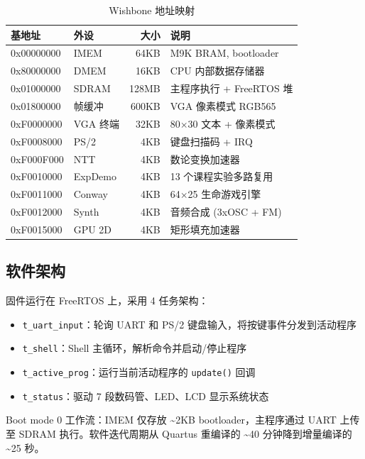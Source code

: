 \documentclass{SYSUReport}
\begin{document}
\begin{table}[!htbp]
    \centering
    \small
    \begin{tabular}{l|l|r|l}
        \hline
        \textbf{基地址} & \textbf{外设} & \textbf{大小} & \textbf{说明} \\
        \hline
        0x00000000 & IMEM   & 64KB  & M9K BRAM, bootloader \\
        0x80000000 & DMEM   & 16KB  & CPU 内部数据存储器 \\
        0x01000000 & SDRAM  & 128MB & 主程序执行 + FreeRTOS 堆 \\
        0x01800000 & 帧缓冲 & 600KB & VGA 像素模式 RGB565 \\
        0xF0000000 & VGA 终端 & 32KB & 80$\times$30 文本 + 像素模式 \\
        0xF0008000 & PS/2   & 4KB   & 键盘扫描码 + IRQ \\
        0xF000F000 & NTT    & 4KB   & 数论变换加速器 \\
        0xF0010000 & ExpDemo & 4KB  & 13 个课程实验多路复用 \\
        0xF0011000 & Conway & 4KB   & 64$\times$25 生命游戏引擎 \\
        0xF0012000 & Synth  & 4KB   & 音频合成 (3xOSC + FM) \\
        0xF0015000 & GPU 2D & 4KB   & 矩形填充加速器 \\
        \hline
    \end{tabular}
    \caption{Wishbone 地址映射}
    \label{tab:addr}
\end{table}

\subsection{软件架构}

固件运行在 FreeRTOS 上，采用 4 任务架构：

\begin{itemize}
    \item \texttt{t\_uart\_input}：轮询 UART 和 PS/2 键盘输入，将按键事件分发到活动程序
    \item \texttt{t\_shell}：Shell 主循环，解析命令并启动/停止程序
    \item \texttt{t\_active\_prog}：运行当前活动程序的 \texttt{update()} 回调
    \item \texttt{t\_status}：驱动 7 段数码管、LED、LCD 显示系统状态
\end{itemize}

Boot mode 0 工作流：IMEM 仅存放 \textasciitilde2KB bootloader，主程序通过 UART 上传至 SDRAM 执行。软件迭代周期从 Quartus 重编译的 \textasciitilde{}40 分钟降到增量编译的 \textasciitilde{}25 秒。
\end{document}
